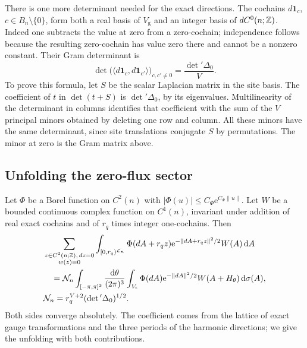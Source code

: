 There is one more determinant needed for the exact directions.
The cochains $d\mathbf1_c$, $c\in B_n\setminus\{0\}$,
form both a real basis of $V_{\mathrm g}$ and an integer
basis of $dC^0(n;\mathbb Z)$. Indeed one subtracts the value at
zero from a zero-cochain; independence follows because
the resulting zero-cochain has value zero there and
cannot be a nonzero constant. Their Gram determinant is
\begin{equation}\label{eq:external-exact-Gram}
 \det\big(\langle d\mathbf1_c,d\mathbf1_{c'}\rangle\big)_{c,c'\ne0}
                           =\frac{\det{}'\Delta_0}{V}.
\end{equation}
To prove this formula, let $S$ be the scalar Laplacian matrix
in the site basis. The coefficient of $t$ in $\det(t+S)$
is $\det{}'\Delta_0$, by its eigenvalues. Multilinearity
of the determinant in columns identifies that coefficient
with the sum of the $V$ principal minors obtained by
deleting one row and column. All these minors have the same
determinant, since site translations conjugate $S$ by
permutations. The minor at zero is the Gram matrix above.

\subsection{Unfolding the zero-flux sector}
\label{subsec:external-zero-flux}

Let $\Phi$ be a Borel function on $C^2(n)$ with
$|\Phi(u)|\le C_\Phi \mathrm e^{C_\Phi\|u\|}$.
Let $W$ be a bounded continuous complex function on
$C^1(n)$, invariant under addition of real exact cochains
and of $r_q$ times integer one-cochains. Then
\begin{align}
 &\sum_{\substack{z\in C^2(n;\mathbb Z),\,dz=0\\w(z)=0}}
       \int_{[0,r_q)^{\mathcal L_n}}
            \Phi(dA+r_qz)\mathrm e^{-\|dA+r_qz\|^2/2}W(A)\,\mathrm d A
       \notag\\
 &\quad=\mathcal N_n
       \int_{[-\pi,\pi]^3}\frac{\mathrm d\theta}{(2\pi)^3}
       \int_{V_{\mathrm t}}
              \Phi(dA)\mathrm e^{-\|dA\|^2/2}W(A+H_\theta)\,\mathrm d\sigma(A),
                                     \label{eq:external-zero-unfolding}\\
 &\mathcal N_n=r_q^{V+2}(\det{}'\Delta_0)^{1/2}.
                                     \label{eq:external-zero-normalization}
\end{align}
Both sides converge absolutely. The coefficient comes from
the lattice of exact gauge transformations and the three
periods of the harmonic directions; we give the unfolding
with both contributions.

